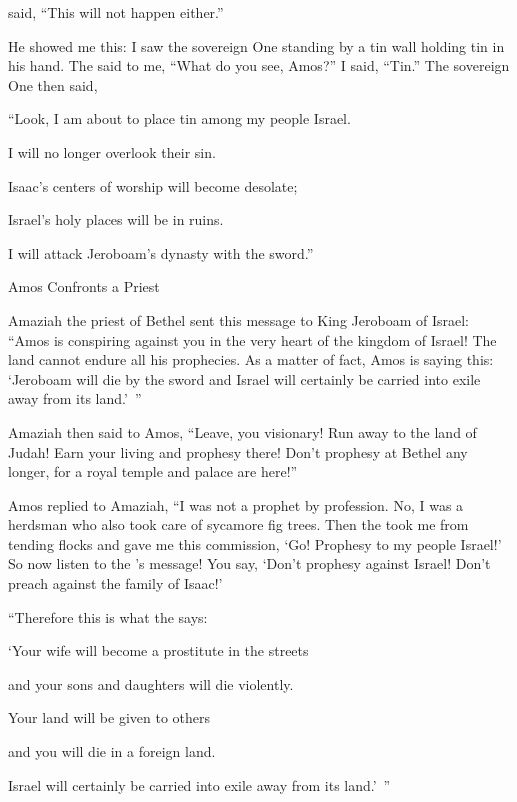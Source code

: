 {{}
said,
“This will not
happen
either.”
\par }{\PP {}He showed
me this: I saw
the sovereign
One standing
by a tin
wall
holding tin
in his hand.
The
{}
said
to
me, “What
do you
see,
Amos?” I said,
“Tin.”
The sovereign
One then said,
\par }{\Q “Look,
I am about to place
tin
among
my people
Israel.
\par }{\Q I will no
longer
overlook their sin.
\par }{\Q {}Isaac’s
centers of worship
will become desolate;
\par }{\Q Israel’s
holy places
will be in
ruins.
\par }{\Q I will attack
Jeroboam’s
dynasty
with the sword.”
\par }{\SH Amos Confronts a Priest
\par }{\PP {}Amaziah
the priest
of Bethel
sent
this message to
King
Jeroboam
of Israel: “Amos
is conspiring against
you in
the very heart
of the kingdom
of Israel! The land
cannot
endure
all
his prophecies.
As a matter of fact,
Amos
is saying
this: ‘Jeroboam
will die
by the sword
and Israel
will certainly be carried
into exile
away from its land.’ ”
\par }{\PP {}Amaziah
then said
to
Amos,
“Leave,
you visionary! Run away
to
the land
of Judah! Earn
your living
and prophesy
there!
Don’t
prophesy
at Bethel
any longer,
for
a royal
temple
and palace are here!”
\par }{\PP {}Amos
replied
to Amaziah,
“I
was not
a prophet
by profession.
No,
I
was a herdsman
who also took care
of sycamore fig trees.
Then the
{}
took
me
from tending
flocks
and gave me this
commission, ‘Go! Prophesy
to
my people
Israel!’
So now
listen
to the
{}’s
message! You
say,
‘Don’t
prophesy
against
Israel! Don’t
preach
against
the family
of Isaac!’
\par }{\Q {}“Therefore
this is what
the {}
says:

\par }{\Q ‘Your wife
will become a prostitute
in the streets

\par }{\Q and your sons
and daughters
will die violently.
\par }{\Q Your land
will be given to others

\par }{\Q and you
will die
in a foreign
land.
\par }{\Q Israel
will certainly be carried
into exile
away from its land.’ ”

}
